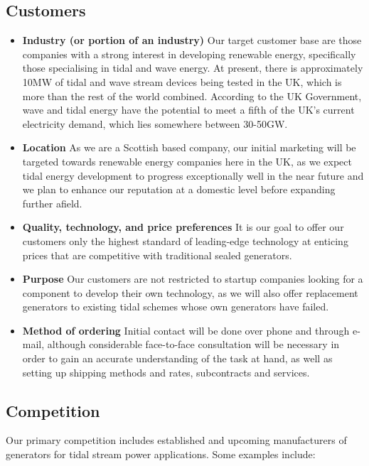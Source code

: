 \documentclass[a4paper,11pt]{article}
\begin{document}
\subsection{Customers}
\begin{itemize}
	\item \textbf{Industry (or portion of an industry)} Our target customer base are those companies with a strong interest in developing renewable energy, specifically those specialising in tidal and wave energy. At present, there is approximately 10MW of tidal and wave stream devices being tested in the UK, which is more than the rest of the world combined\cite{f1}. According to the UK Government, wave and tidal energy have the potential to meet a fifth of the UK's current electricity demand, which lies somewhere between 30-50GW\cite{f2}.
	
	\item \textbf{Location} As we are a Scottish based company, our initial marketing will be targeted towards renewable energy companies here in the UK, as we expect tidal energy development to progress exceptionally well in the near future and we plan to enhance our reputation at a domestic level before expanding further afield.
	
	\item \textbf{Quality, technology, and price preferences} It is our goal to offer our customers only the highest standard of leading-edge technology at enticing prices that are competitive with traditional sealed generators.
	
	\item \textbf{Purpose} Our customers are not restricted to startup companies looking for a component to develop their own technology, as we will also offer replacement generators to existing tidal schemes whose own generators have failed.
	
	\item \textbf{Method of ordering} Initial contact will be done over phone and through e-mail, although considerable face-to-face consultation will be necessary in order to gain an accurate understanding of the task at hand, as well as setting up shipping methods and rates, subcontracts and services.
\end{itemize}

\subsection{Competition}
Our primary competition includes established and upcoming manufacturers of generators for tidal stream power applications. Some examples include:
\end{document}
